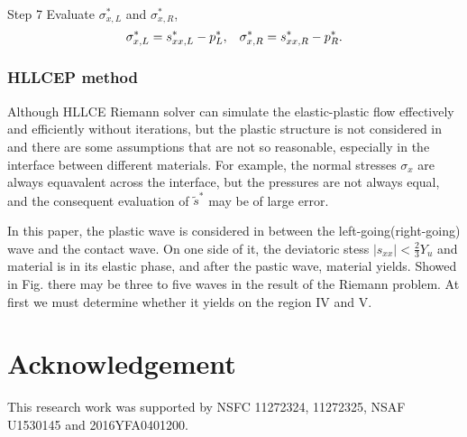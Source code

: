 \documentclass{article}
\theoremstyle{plain}\newtheorem{definition}{\sc{Definition}}
\theoremstyle{defination}\newtheorem{example}{Example}[section]
\numberwithin{equation}{section}
\numberwithin{table}{section}
\begin{document}
Step 7 Evaluate $\sigma_{x,L}^*$ and $\sigma_{x,R}^*$,
\begin{equation}
  \sigma_{x,L}^* = s_{xx,L}^* - p_L^*, \hspace{0.3cm} \sigma_{x,R}^* = s_{xx,R}^*- p_R^*.
\end{equation}
\subsubsection{HLLCEP method}
Although HLLCE Riemann solver can simulate the elastic-plastic flow effectively and efficiently without iterations, but the plastic structure is not considered in and  there are some assumptions that are not so reasonable, especially in the interface between different materials. For example, the normal stresses $\sigma_x$ are  always equavalent across the interface, but the pressures are not always equal, and the consequent evaluation of $\widetilde{s}^*$ may   be of large error. 

In this paper, the plastic wave is considered in between the left-going(right-going) wave and the contact wave. On one side of it, the deviatoric stess $|s_{xx}|<\frac{2}{3}Y_u$ and material is in its elastic phase, and after the pastic wave, material  yields.   Showed in Fig.  there  may be  three to  five waves in the result of the Riemann problem. At first we must determine whether it yields on the region IV and V. 

\begin{figures}
\end{figures}












	















 



%
\section*{Acknowledgement} 
This research work was supported by NSFC 11272324, 11272325, NSAF U1530145 and 2016YFA0401200.
\end{document}
